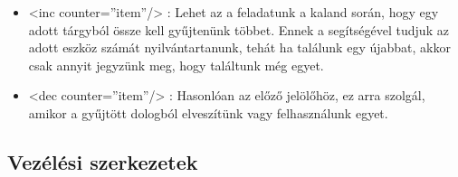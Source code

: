 \documentclass[12pt,a4paper,oneside]{report}
\begin{document}
\begin{itemize}
        \item <{\color{Tag}inc}
          {\color{Attr}counter}={\color{Value}''item''}/> : Lehet az a
          feladatunk a kaland során, hogy egy adott tárgyból össze kell
          gyűjtenünk többet. Ennek a segítségével tudjuk az adott eszköz
          számát nyilvántartanunk, tehát ha találunk egy újabbat, akkor
          csak annyit jegyzünk meg, hogy találtunk még egyet.
          
        \item <{\color{Tag}dec}
          {\color{Attr}counter}={\color{Value}''item''}/> : Hasonlóan az
          előző jelölőhöz, ez arra szolgál, amikor a gyűjtött dologból
          elveszítünk vagy felhasználunk egyet.
      \end{itemize}

    \subsection{Vezélési szerkezetek}
\end{document}
